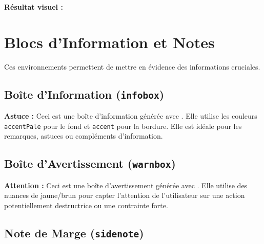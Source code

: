 \begin{texblock}

\newcommand{\badgePerso}{\badge[customPurple]{Spécial}}
\end{texblock}

\textbf{Résultat visuel :} \badgePerso


\section{Blocs d'Information et Notes}

Ces environnements permettent de mettre en évidence des informations cruciales.

\subsection{Boîte d'Information (\texttt{infobox})}
\begin{infobox}
    \textbf{Astuce :} Ceci est une boîte d'information générée avec . Elle utilise les couleurs \texttt{accentPale} pour le fond et \texttt{accent} pour la bordure. Elle est idéale pour les remarques, astuces ou compléments d'information.
\end{infobox}

\subsection{Boîte d'Avertissement (\texttt{warnbox})}
\begin{warnbox}
    \textbf{Attention :} Ceci est une boîte d'avertissement générée avec . Elle utilise des nuances de jaune/brun pour capter l'attention de l'utilisateur sur une action potentiellement destructrice ou une contrainte forte.
\end{warnbox}

\subsection{Note de Marge (\texttt{sidenote})}

